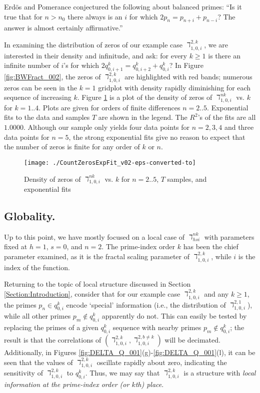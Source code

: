 \documentclass[12pt,longtitle,times]{amsart}
\begin{document}
Erd\"{o}s and Pomerance conjectured the following about balanced primes: ``Is it true that for $n>n_0$ there always is an $i$ for which $2p_n=p_{n+i}+p_{n-i}$? The answer is almost certainly affirmative.''\cite{Erdos-Some-Problems-1971} 

In examining the distribution of zeros of our example case $\daleth_{1,0,i}^{2,k}$, we are interested in their density and infinitude, and ask: for every $k\geq{}1$ is there an infinite number of $i$'s for which $2q_{0,i+1}^k=q_{0,i+2}^k+q_{0,i}^k$? In Figure \ref{fig:BWFract_002}, the zeros of $\daleth_{1,0,i}^{2,k}$ are highlighted with red bands; numerous zeros can be seen in the $k=1$ gridplot with density rapidly diminishing for each sequence of increasing $k$. Figure \ref{fig:CountZerosExpFit} is a plot of the density of zeros of $\daleth_{1,0,i}^{nk}$ vs. $k$ for $k=1..4$. Plots are given for orders of finite differences $n=2..5$. Exponential fits to the data and samples $T$ are shown in the legend. The $R^2$'s of the fits are all $1.0000$. Although our sample only yields four data points for $n=2,3,4$ and three data points for $n=5$, the strong exponential fits give no reason to expect that the number of zeros is finite for any order of $k$ or $n$.

\clearpage

\begin{figure}[h]
\centering
\texttt{[image: ./CountZerosExpFit\_v02-eps-converted-to]}
\caption{Density of zeros of $\daleth_{1,0,i}^{nk}$ vs. $k$ for $n=2..5$, $T$ samples, and exponential fits}
\label{fig:CountZerosExpFit}
\end{figure}

\subsection[short]{Globality.} Up to this point, we have mostly focused on a local case of $\daleth_{hsi}^{nk}$ with parameters fixed at $h=1$, $s=0$, and $n=2$. The prime-index order $k$ has been the chief parameter examined, as it is the fractal scaling parameter of $\daleth_{1,0,i}^{2,k}$, while $i$ is the index of the function.

Returning to the topic of local structure discussed in Section \ref{Section:Introduction}, consider that for our example case $\daleth_{1,0,i}^{2,k}$ and any $k\geq1$, the primes $p_n\in{}q_{0,i}^k$ encode `special' information (i.e., the distribution of $\daleth_{1,0,i}^{2,1}$), while all other primes $p_m \notin{}q_{0,i}^k$ apparently do not. This can easily be tested by replacing the primes of a given $q_{0,i}^k$ sequence with nearby primes $p_m \notin{}q_{0,i}^k$; the result is that the correlations of $(\daleth_{1,0,i}^{2,k},\daleth_{1,0,i}^{2,b\neq{}k})$ will be decimated. Additionally, in Figures \ref{fig:DELTA_Q_001}(g)-\ref{fig:DELTA_Q_001}(l), it can be seen that the values of $\daleth_{1,0,i}^{2,k}$ oscillate rapidly about zero, indicating the sensitivity of $\daleth_{1,0,i}^{2,k}$ to $q_{0,i}^k$. Thus, we may say that $\daleth_{1,0,i}^{2,k}$ is a structure with \textit{local information at the prime-index order (or $k$th) place}.  
\end{document}
